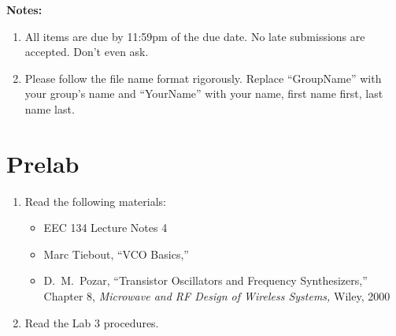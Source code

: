 \documentclass[letterpaper, 11pt]{article}
\begin{document}
\textbf{Notes:}
\begin{enumerate}
	\item All items are due by 11:59pm of the due date. No late submissions are accepted. Don't even ask. 
	
	\item Please follow the file name format rigorously. Replace ``GroupName'' with your group's name and ``YourName'' with your name, first name first, last name last. 
	
\end{enumerate}

\section{Prelab}
\begin{enumerate}
	\item Read the following materials:	
		\begin{itemize}
			\item EEC 134 Lecture Notes 4
			
			\item Marc Tiebout, ``VCO Basics,''	
			
			\item D.~M.~Pozar, ``Transistor Oscillators and Frequency Synthesizers,'' Chapter 8, \emph{Microwave and RF Design of Wireless Systems,} Wiley, 2000
		\end{itemize}
	\item Read the Lab 3 procedures.
\end{enumerate}

\reversemarginpar
{}  
	
\end{document}

